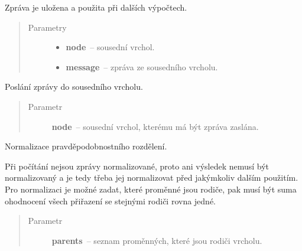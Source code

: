\begin{fulllineitems}
\begin{fulllineitems}
Zpráva je uložena a použita při dalších výpočtech.
\begin{quote}\begin{description}
\item[{Parametry}] \leavevmode\begin{itemize}
\item {} 
\textbf{node}~-- sousední vrchol.

\item {} 
\textbf{message}~-- zpráva ze sousedního vrcholu.

\end{itemize}

\end{description}\end{quote}

\end{fulllineitems}


\begin{fulllineitems}
\label{alex.infer:alex.infer.factor.alex.infer.node.Node.message_to}
Poslání zprávy do sousedního vrcholu.
\begin{quote}\begin{description}
\item[{Parametr}] \leavevmode
\textbf{node}~-- sousední vrchol, kterému má být zpráva zaslána.

\end{description}\end{quote}

\end{fulllineitems}


\begin{fulllineitems}
\label{alex.infer:alex.infer.factor.alex.infer.node.Node.normalize}
Normalizace pravděpodobnostního rozdělení.

Při počítání nejsou zprávy normalizované, proto ani výsledek nemusí být
normalizovaný a je tedy třeba jej normalizovat před jakýmkoliv dalším
použitím. Pro normalizaci je možné zadat, které proměnné jsou rodiče,
pak musí být suma ohodnocení všech přiřazení se stejnými rodiči rovna
jedné.
\begin{quote}\begin{description}
\item[{Parametr}] \leavevmode
\textbf{parents}~-- seznam proměnných, které jsou rodiči vrcholu.


\end{description}
\end{quote}
\end{fulllineitems}
\end{fulllineitems}
